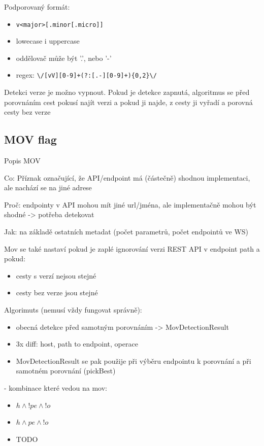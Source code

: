 \documentclass[czech,DP]{thesiskiv}
\begin{document}
Podporovaný formát:
\begin{itemize}
	\item \verb|v<major>[.minor[.micro]]|
	\item lowecase i uppercase
	\item oddělovač může být '.', nebo '-'
	\item regex: \verb|\/[vV][0-9]+(?:[.-][0-9]+){0,2}\/|
\end{itemize}

Detekci verze je možno vypnout. Pokud je detekce zapnutá, algoritmus se před porovnáním cest pokusí najít verzi a pokud ji najde, z cesty ji vyřadí a porovná cesty bez verze
	
\subsection{MOV flag}	

Popis MOV

Co: Příznak označující, že API/endpoint má (částečně) shodnou implementaci, ale nachází se na jiné adrese

Proč: endpointy v API mohou mít jiné url/jména, ale implementačně mohou být shodné -> potřeba detekovat

Jak: na základě ostatních metadat (počet parametrů, počet endpointů ve WS)

Mov se také nastaví pokud je zaplé ignorování verzi REST API v endpoint path a pokud: 
\begin{itemize}
	\item cesty s verzí nejsou stejné
	\item cesty bez verze jsou stejné
\end{itemize}

Algorimuts (nemusí vždy fungovat správně):
\begin{itemize}
	\item  obecná detekce před samotným porovnáním -> MovDetectionResult
	\item  3x diff: host, path to endpoint, operace
	\item  MovDetectionResult se pak použije při výběru endpointu k porovnání a při samotném porovnání (pickBest)
\end{itemize}
	
- kombinace které vedou na mov: 
\begin{itemize}
	\item $h \land !pe \land !o$
	\item $h \land pe \land !o$
	\item TODO
\end{itemize}
	
\end{document}
